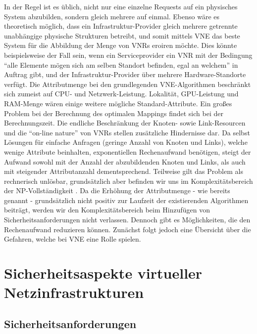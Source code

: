 \documentclass{lni}
\begin{document}
In der Regel ist es üblich, nicht nur eine einzelne Requests auf ein physisches System abzubilden, sondern gleich mehrere auf einmal. Ebenso wäre es theoretisch möglich, dass ein Infrastruktur-Provider gleich mehrere getrennte unabhängige physische Strukturen betreibt, und somit mittels VNE das beste System für die Abbildung der Menge von VNRs eroiren möchte. Dies könnte beispielsweise der Fall sein, wenn ein Serviceprovider ein VNR mit der Bedingung "`alle Elemente mögen sich am selben Standort befinden, egal an welchem"' in Auftrag gibt, und der Infrastruktur-Provider über mehrere Hardware-Standorte verfügt.
\newline
Die Attributmenge bei den grundlegenden VNE-Algorithmen beschränkt  sich zumeist auf CPU- und Netzwerk-Leistung. 
Lokalität, GPU-Leistung und RAM-Menge wären einige weitere mögliche Standard-Attribute. Ein großes Problem bei der Berechnung des optimalen Mappings findet sich bei der Berechnungszeit. Die endliche Beschränkung der Knoten- sowie Link-Resourcen und die "`on-line nature"' von VNRs stellen zusätzliche Hindernisse dar. Da selbst Lösungen für einfache Anfragen (geringe Anzahl von Knoten und Links), welche wenige Attribute beinhalten, exponentiellen Rechenaufwand benötigen, steigt der Aufwand sowohl mit der Anzahl der abzubildenden Knoten und Links, als auch mit steigender Attributanzahl dementsprechend. Teilweise gilt das Problem als rechnerisch unlösbar, grundsätzlich aber befinden wir uns im Komplexitätsbereich der NP-Vollständigkeit \cite{SVNE2}. Da die Erhöhung der Attributmenge - wie bereits genannt - grundsätzlich nicht positiv zur Laufzeit der existierenden Algorithmen beiträgt, werden wir den Komplexitätsbereich beim Hinzufügen von Sicherheitsanforderungen nicht verlassen. Dennoch gibt es Möglichkeiten, die den Rechenaufwand reduzieren können. Zunächst folgt jedoch eine Übersicht über die Gefahren, welche bei VNE eine Rolle spielen.



\section{Sicherheitsaspekte virtueller Netzinfrastrukturen}
\label{sec:gefahren}

\subsection{Sicherheitsanforderungen}
\label{subsec:gefahren_anforderungen}

\end{document}
